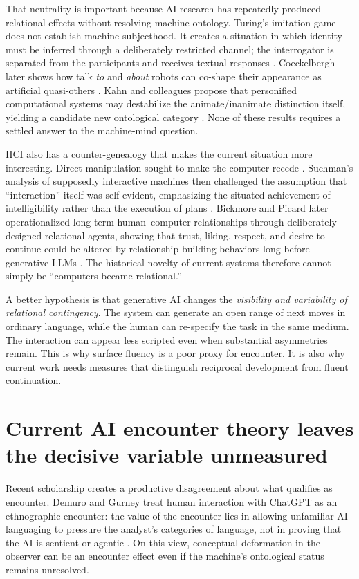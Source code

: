 \documentclass[11pt]{article}
\begin{document}
That neutrality is important because AI research has repeatedly produced relational effects without resolving machine ontology. Turing's imitation game does not establish machine subjecthood. It creates a situation in which identity must be inferred through a deliberately restricted channel; the interrogator is separated from the participants and receives textual responses \citep{Turing1950Computing}. Coeckelbergh later shows how talk \emph{to} and \emph{about} robots can co-shape their appearance as artificial quasi-others \citep{Coeckelbergh2011YouRobot}. Kahn and colleagues propose that personified computational systems may destabilize the animate/inanimate distinction itself, yielding a candidate new ontological category \citep{KahnEtAl2011Ontological}. None of these results requires a settled answer to the machine-mind question.

HCI also has a counter-genealogy that makes the current situation more interesting. Direct manipulation sought to make the computer recede \citep{Shneiderman1983Direct}. Suchman's analysis of supposedly interactive machines then challenged the assumption that ``interaction'' itself was self-evident, emphasizing the situated achievement of intelligibility rather than the execution of plans \citep{Suchman1987Plans}. Bickmore and Picard later operationalized long-term human--computer relationships through deliberately designed relational agents, showing that trust, liking, respect, and desire to continue could be altered by relationship-building behaviors long before generative LLMs \citep{BickmorePicard2005Relationships}. The historical novelty of current systems therefore cannot simply be ``computers became relational.''

A better hypothesis is that generative AI changes the \emph{visibility and variability of relational contingency}. The system can generate an open range of next moves in ordinary language, while the human can re-specify the task in the same medium. The interaction can appear less scripted even when substantial asymmetries remain. This is why surface fluency is a poor proxy for encounter. It is also why current work needs measures that distinguish reciprocal development from fluent continuation.

\section{Current AI encounter theory leaves the decisive variable unmeasured}

Recent scholarship creates a productive disagreement about what qualifies as encounter. Demuro and Gurney treat human interaction with ChatGPT as an ethnographic encounter: the value of the encounter lies in allowing unfamiliar AI languaging to pressure the analyst's categories of language, not in proving that the AI is sentient or agentic \citep{DemuroGurney2024Encounter}. On this view, conceptual deformation in the observer can be an encounter effect even if the machine's ontological status remains unresolved.
\end{document}
